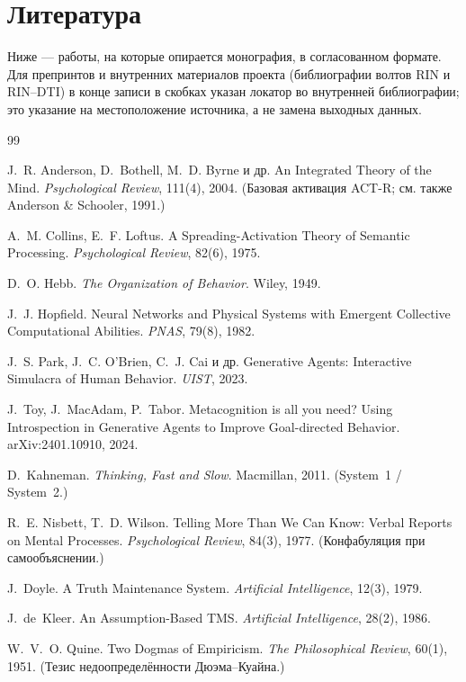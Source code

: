 \chapter{Литература}
\label{ch:references}

Ниже --- работы, на которые опирается монография, в согласованном формате.
Для препринтов и внутренних материалов проекта (библиографии волтов RIN и
RIN--DTI) в конце записи в скобках указан локатор во внутренней
библиографии; это указание на местоположение источника, а не замена выходных
данных.

\begin{thebibliography}{99}
\small

 J.~R. Anderson, D.~Bothell, M.~D. Byrne и др.
An Integrated Theory of the Mind. \emph{Psychological Review}, 111(4), 2004.
(Базовая активация ACT-R; см. также Anderson \& Schooler, 1991.)

 A.~M. Collins, E.~F. Loftus.
A Spreading-Activation Theory of Semantic Processing.
\emph{Psychological Review}, 82(6), 1975.

 D.~O. Hebb. \emph{The Organization of Behavior}. Wiley, 1949.

 J.~J. Hopfield.
Neural Networks and Physical Systems with Emergent Collective Computational Abilities.
\emph{PNAS}, 79(8), 1982.

 J.~S. Park, J.~C. O'Brien, C.~J. Cai и др.
Generative Agents: Interactive Simulacra of Human Behavior. \emph{UIST}, 2023.

 J.~Toy, J.~MacAdam, P.~Tabor.
Metacognition is all you need? Using Introspection in Generative Agents to Improve Goal-directed Behavior.
arXiv:2401.10910, 2024.

 D.~Kahneman. \emph{Thinking, Fast and Slow}. Macmillan, 2011.
(System~1 / System~2.)

 R.~E. Nisbett, T.~D. Wilson.
Telling More Than We Can Know: Verbal Reports on Mental Processes.
\emph{Psychological Review}, 84(3), 1977. (Конфабуляция при самообъяснении.)

 J.~Doyle. A Truth Maintenance System.
\emph{Artificial Intelligence}, 12(3), 1979.

 J.~de~Kleer. An Assumption-Based TMS.
\emph{Artificial Intelligence}, 28(2), 1986.

 W.~V.~O. Quine. Two Dogmas of Empiricism.
\emph{The Philosophical Review}, 60(1), 1951. (Тезис недоопределённости
Дюэма–Куайна.)


\end{thebibliography}
